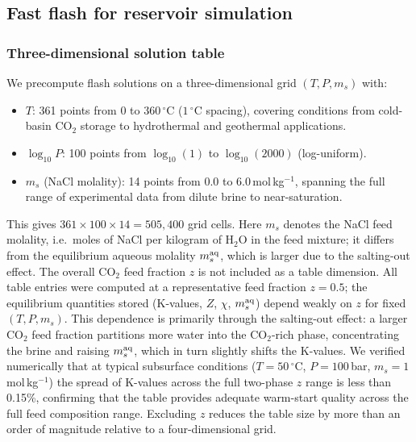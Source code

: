 \documentclass[preprint,12pt,authoryear]{elsarticle}
\begin{document}
\subsection{Fast flash for reservoir simulation}
\label{sec:fast_flash}

\subsubsection{Three-dimensional solution table}
\label{sec:table}

We precompute flash solutions on a three-dimensional grid $(T, P, m_s)$ with:
\begin{itemize}
  \item $T$: 361 points from 0 to $360\,^\circ$C ($1\,^\circ$C spacing),
        covering conditions from cold-basin CO$_2$ storage to hydrothermal and
        geothermal applications.
  \item $\log_{10}P$: 100 points from $\log_{10}(1)$ to $\log_{10}(2000)$ (log-uniform).
  \item $m_s$ (NaCl molality): 14 points from 0.0 to 6.0\,mol\,kg$^{-1}$, spanning
        the full range of experimental data from dilute brine to near-saturation.
\end{itemize}
This gives $361 \times 100 \times 14 = 505{,}400$ grid cells.
Here $m_s$ denotes the NaCl feed molality, i.e.\ moles of NaCl per kilogram
of H$_2$O in the feed mixture; it differs from the equilibrium aqueous
molality $m_s^{\rm aq}$, which is larger due to the salting-out effect.
The overall CO$_2$ feed fraction $z$ is not included as a table dimension.
All table entries were computed at a representative feed fraction $z = 0.5$;
the equilibrium quantities stored (K-values, $Z$, $\chi$, $m_s^{\rm aq}$)
depend weakly on $z$ for fixed $(T, P, m_s)$.
This dependence is primarily through the salting-out effect: a larger CO$_2$
feed fraction partitions more water into the CO$_2$-rich phase, concentrating
the brine and raising $m_s^{\rm aq}$, which in turn slightly shifts the
K-values.
We verified numerically that at typical subsurface conditions ($T = 50\,^\circ$C,
$P = 100$\,bar, $m_s = 1$\,mol\,kg$^{-1}$) the spread of K-values across the
full two-phase $z$ range is less than 0.15\%, confirming that the table
provides adequate warm-start quality across the full feed composition range.
Excluding $z$ reduces the table size by more than an order of magnitude
relative to a four-dimensional grid.
\end{document}
